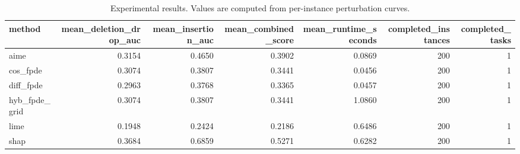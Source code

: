 \begin{table}[t]
\caption{Experimental results. Values are computed from per-instance perturbation curves.}
\label{tab:main_results_computed}
\centering
\begin{tabular}{lrrrrrr}
\toprule
method & mean\_deletion\_drop\_auc & mean\_insertion\_auc & mean\_combined\_score & mean\_runtime\_seconds & completed\_instances & completed\_tasks \\
\midrule
aime & 0.3154 & 0.4650 & 0.3902 & 0.0869 & 200 & 1 \\
cos\_fpde & 0.3074 & 0.3807 & 0.3441 & 0.0456 & 200 & 1 \\
diff\_fpde & 0.2963 & 0.3768 & 0.3365 & 0.0457 & 200 & 1 \\
hyb\_fpde\_grid & 0.3074 & 0.3807 & 0.3441 & 1.0860 & 200 & 1 \\
lime & 0.1948 & 0.2424 & 0.2186 & 0.6486 & 200 & 1 \\
shap & 0.3684 & 0.6859 & 0.5271 & 0.6282 & 200 & 1 \\
\bottomrule
\end{tabular}

\end{table}
